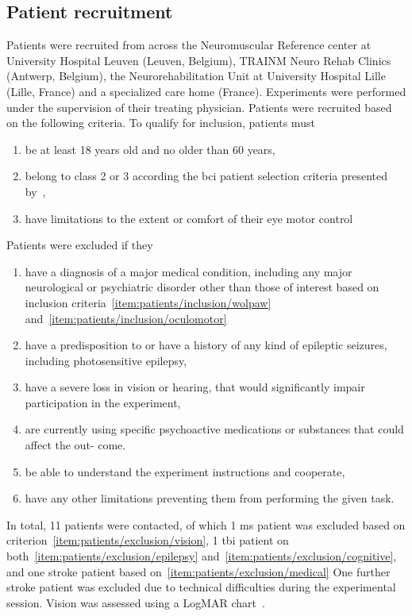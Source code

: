 \subsection{Patient recruitment}
Patients were recruited from across the Neuromuscular Reference center at
University Hospital Leuven (Leuven, Belgium), TRAINM Neuro Rehab Clinics
(Antwerp, Belgium), the Neurorehabilitation Unit at University Hospital Lille
(Lille, France) and a specialized care home (France).
Experiments were performed under the supervision of their treating physician.
Patients were recruited based on the following criteria.
To qualify for inclusion, patients must
\begin{enumerate}
	\item be at least 18 years old and no older than 60
	years,
  \item belong to class 2 or 3 according the \ac{bci}	patient selection criteria
    presented by~\textcite{Wolpaw2006},\label{item:patients/inclusion/wolpaw}
  \item have limitations to the extent or comfort of their eye motor control\label{item:patients/inclusion/oculomotor}
\end{enumerate}
Patients were excluded if they
\begin{enumerate}
  \item have a diagnosis of a major medical condition, including any major
    neurological or psychiatric disorder other than those of interest based on
    inclusion criteria~\ref{item:patients/inclusion/wolpaw}
    and~\ref{item:patients/inclusion/oculomotor}\label{item:patients/exclusion/medical}
  \item have a predisposition to or have a history of any kind of epileptic seizures,
    including photosensitive epilepsy,\label{item:patients/exclusion/epilepsy}
  \item have a severe loss in vision or hearing, that would significantly impair
        participation in the experiment,\label{item:patients/exclusion/vision}
  \item are currently using specific psychoactive medications or substances that could affect the out-
        come.\label{item:patients/exclusion/cognitive}
  \item be able to understand the experiment instructions and cooperate,
  \item have any other limitations preventing them from performing the given task.
\end{enumerate}

In total, 11 patients were contacted, of which 1 \ac{ms} patient was excluded based on
criterion~\ref{item:patients/exclusion/vision}, 1 \ac{tbi} patient on
both~\ref{item:patients/exclusion/epilepsy}
and~\ref{item:patients/exclusion/cognitive}, and one stroke patient based
on~\ref{item:patients/exclusion/medical}
One further stroke patient was excluded due to technical
difficulties during the experimental session.
Vision was assessed using a LogMAR chart~\cite{Bailey1976}.

